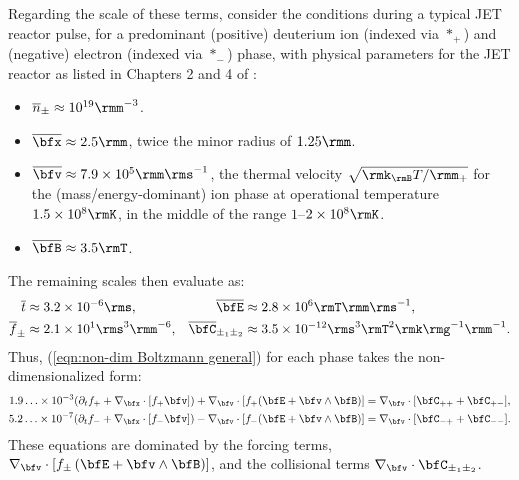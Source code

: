     Regarding the scale of these terms, consider the conditions during a typical JET reactor pulse, for a predominant (positive) deuterium  ion (indexed via $*_{+}$) and (negative) electron (indexed via $*_{-}$) phase, with physical parameters for the JET reactor as listed in Chapters 2 and 4 of \cite{Wes00}:
    \begin{itemize}
        \item  $\overline{n}_{\pm}  \approx  10^{19}\rmm^{- 3}$.
        \item  $\overline{\bfx}     \approx  2.5\rmm$, twice the minor radius of $1.25\rmm$.
        \item  $\overline{\bfv}     \approx  7.9\times 10^{5}\rmm\rms^{- 1}$, the thermal velocity $\sqrt{\rmk_{\rmB}T/\rmm_{+}}$ for the (mass/energy-dominant) ion phase at operational temperature $1.5\times 10^{8}\rmK$, in the middle of the range $1$–$2\times 10^{8}\rmK$.
        \item  $\overline{\bfB}     \approx  3.5\rmT$.
    \end{itemize}
    The remaining scales then evaluate as:
    \begin{align*}
        \overline{t}           &\approx  3.2\times 10^{- 6}\rms,              &
        \overline{\bfE}        &\approx  2.8\times 10^{6}\rmT\rmm\rms^{- 1},  \\
        \overline{f}_{\pm}     &\approx  2.1\times 10^{1}\rms^{3}\rmm^{- 6},  &
        \overline{\bfC}_{\pm_{1}\pm_{2}}  &\approx  3.5\times 10^{- 12}\rms^{3}\rmT^{2}\rmk\rmg^{- 1}\rmm^{- 1}.
    \end{align*}
    Thus, (\ref{eqn:non-dim Boltzmann general}) for each phase takes the non-dimensionalized form:
    \begin{align}
        1.9\ldots\times 10^{- 3}(\partial_{t}f_{+} + \nabla_{\bfx}\cdot[f_{+}\bfv]) + \nabla_{\bfv}\cdot[f_{+}(\bfE + \bfv\wedge\bfB)]  &=  \nabla_{\bfv}\cdot[\bfC_{++} + \bfC_{+-}],  \label{eqn:non-dim Boltzmann +}  \\
        5.2\ldots\times 10^{- 7}(\partial_{t}f_{-} + \nabla_{\bfx}\cdot[f_{-}\bfv]) - \nabla_{\bfv}\cdot[f_{-}(\bfE + \bfv\wedge\bfB)]  &=  \nabla_{\bfv}\cdot[\bfC_{-+} + \bfC_{--}].  \label{eqn:non-dim Boltzmann -}
    \end{align}
    These equations are dominated by the forcing terms, $\nabla_{\bfv}\cdot[f_{\pm}\left(\bfE + \bfv\wedge\bfB\right)]$, and the collisional terms $\nabla_{\bfv}\cdot\bfC_{\pm_{1}\pm_{2}}$.

    
